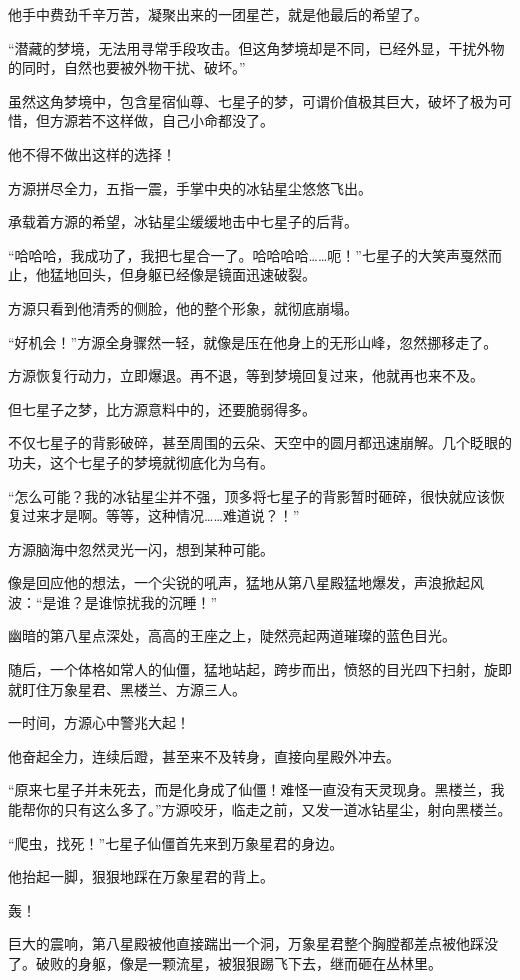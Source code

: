 \begin{this_body}
他手中费劲千辛万苦，凝聚出来的一团星芒，就是他最后的希望了。

“潜藏的梦境，无法用寻常手段攻击。但这角梦境却是不同，已经外显，干扰外物的同时，自然也要被外物干扰、破坏。”

虽然这角梦境中，包含星宿仙尊、七星子的梦，可谓价值极其巨大，破坏了极为可惜，但方源若不这样做，自己小命都没了。

他不得不做出这样的选择！

方源拼尽全力，五指一震，手掌中央的冰钻星尘悠悠飞出。

承载着方源的希望，冰钻星尘缓缓地击中七星子的后背。

“哈哈哈，我成功了，我把七星合一了。哈哈哈哈……呃！”七星子的大笑声戛然而止，他猛地回头，但身躯已经像是镜面迅速破裂。

方源只看到他清秀的侧脸，他的整个形象，就彻底崩塌。

“好机会！”方源全身骤然一轻，就像是压在他身上的无形山峰，忽然挪移走了。

方源恢复行动力，立即爆退。再不退，等到梦境回复过来，他就再也来不及。

但七星子之梦，比方源意料中的，还要脆弱得多。

不仅七星子的背影破碎，甚至周围的云朵、天空中的圆月都迅速崩解。几个眨眼的功夫，这个七星子的梦境就彻底化为乌有。

“怎么可能？我的冰钻星尘并不强，顶多将七星子的背影暂时砸碎，很快就应该恢复过来才是啊。等等，这种情况……难道说？！”

方源脑海中忽然灵光一闪，想到某种可能。

像是回应他的想法，一个尖锐的吼声，猛地从第八星殿猛地爆发，声浪掀起风波：“是谁？是谁惊扰我的沉睡！”

幽暗的第八星点深处，高高的王座之上，陡然亮起两道璀璨的蓝色目光。

随后，一个体格如常人的仙僵，猛地站起，跨步而出，愤怒的目光四下扫射，旋即就盯住万象星君、黑楼兰、方源三人。

一时间，方源心中警兆大起！

他奋起全力，连续后蹬，甚至来不及转身，直接向星殿外冲去。

“原来七星子并未死去，而是化身成了仙僵！难怪一直没有天灵现身。黑楼兰，我能帮你的只有这么多了。”方源咬牙，临走之前，又发一道冰钻星尘，射向黑楼兰。

“爬虫，找死！”七星子仙僵首先来到万象星君的身边。

他抬起一脚，狠狠地踩在万象星君的背上。

轰！

巨大的震响，第八星殿被他直接踹出一个洞，万象星君整个胸膛都差点被他踩没了。破败的身躯，像是一颗流星，被狠狠踢飞下去，继而砸在丛林里。


\end{this_body}

